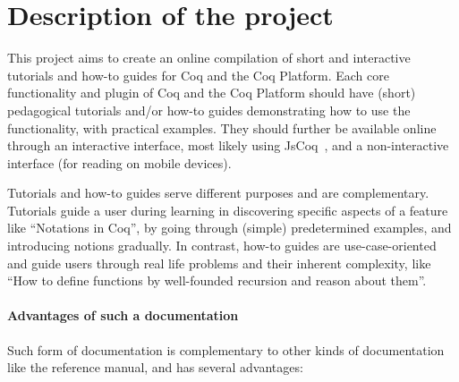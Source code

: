 \documentclass{easychair}
\begin{document}
\section{Description of the project}

This project aims to create an online compilation of short and interactive
tutorials and how-to guides for Coq and the Coq Platform.
Each core functionality and plugin of Coq and the Coq Platform should have
(short) pedagogical tutorials and/or how-to guides demonstrating how to use the
functionality, with practical examples. They should further be available online
through an interactive interface, most likely using JsCoq~\cite{jscoq},
and a non-interactive interface (for reading on mobile devices).

Tutorials and how-to guides serve different purposes and are complementary.
Tutorials guide a user during learning in discovering specific aspects of a
feature like ``Notations in Coq'', by going through (simple) predetermined
examples, and introducing notions gradually. In contrast, how-to guides are
use-case-oriented and guide users through real life problems and their inherent
complexity, like ``How to define functions by well-founded recursion and reason
about them''.

\paragraph{Advantages of such a documentation}

Such form of documentation is complementary to other kinds of documentation like
the reference manual, and has several advantages:
\end{document}
